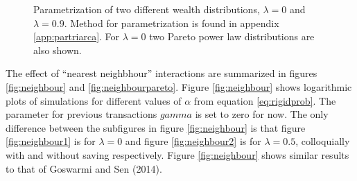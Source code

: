 \documentclass[10pt, a4paper]{amsart}
\begin{document}
\begin{figure}
\begin{subfigure}{.5\textwidth}
  \caption{}
  \label{fig:paramfig2}
\end{subfigure}
\caption{Parametrization of two different wealth distributions, $\lambda=0$ and $\lambda=0.9$. Method for parametrization is found in appendix \ref{app:partriarca}. For $\lambda=0$ two Pareto power law distributions are also shown.}
\label{fig:paramfig}
\end{figure}


The effect of ``nearest neighbhour'' interactions are summarized in figures \ref{fig:neighbour} and \ref{fig:neighbourpareto}. Figure \ref{fig:neighbour} shows logarithmic plots of simulations for different values of $\alpha$ from equation \ref{eq:rigidprob}. The parameter for previous transactions $gamma$ is set to zero for now. The only difference between the subfigures in figure \ref{fig:neighbour} is that figure \ref{fig:neighbour1} is for $\lambda=0$ and figure \ref{fig:neighbour2} is for $\lambda=0.5$, colloquially with and without saving respectively. Figure \ref{fig:neighbour} shows similar results to that of Goswarmi and Sen (2014)\cite{GoswamiSen}.
\end{document}
